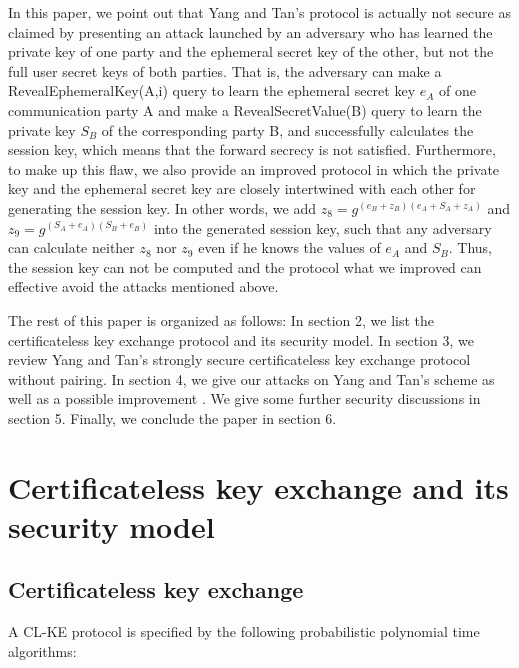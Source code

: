 \documentclass[final,1p,times,twocolumn]{elsarticle}
\begin{document}
\vspace{0.1cm}


In this paper, we point out that Yang and Tan's protocol is actually not secure as claimed by presenting an attack launched by an adversary who has learned the private key of one party and the ephemeral secret key of the other, but not the full user secret keys of both parties. That is, the adversary can make a RevealEphemeralKey(A,i) query to learn the ephemeral secret key $e_{A}$ of one communication party A and make a RevealSecretValue(B) query to learn the private key $S_{B}$ of the corresponding party B, and successfully calculates the session key, which means that the forward secrecy is not satisfied. Furthermore, to make up this flaw, we also provide an improved protocol in which the private key and the ephemeral secret key are closely  intertwined with each other for generating the session key. In other words, we add $z_{8}=g^{(e_{B}+z_{B})(e_{A}+S_{A}+z_{A})}$ and $z_{9}=g^{(S_{A}+e_{A})(S_{B}+e_{B})}$ into the generated session key, such that any adversary can calculate neither $z_{8}$ nor  $z_{9}$ even if he knows the values of $e_{A}$ and $S_{B}$. Thus, the session key can not be computed and the protocol what we improved can effective avoid the attacks mentioned above.

\vspace{0.1cm}

The rest of this paper is organized as follows: In section 2, we list the certificateless key exchange protocol and its security model. In section 3, we review Yang and Tan's strongly secure certificateless key exchange protocol without pairing. In section 4, we give our attacks on Yang and Tan's scheme as well as a possible improvement . We give some further security discussions in section 5.  Finally, we conclude the paper in section 6.


\section{Certificateless key exchange and its security model}
\label{2}

\subsection{Certificateless  key  exchange}
\label{2.1}

A CL-KE protocol is specified by the following probabilistic polynomial time algorithms:
\vspace{0.2cm}
\end{document}
